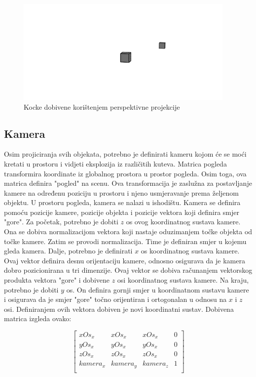 \documentclass{foi}
\begin{document}
\begin{figure}[H]
	\centering
	\includegraphics[width=0.95\textwidth]{slike/37_PerspektivnaProjekcijaKuba.png}
	\captionsetup{justification=centering}
	\caption{Kocke dobivene korištenjem perspektivne projekcije}
	\label{fig:PerspektivnaProjekcijaKuba}
\end{figure}

\subsection{Kamera}
Osim projiciranja svih objekata, potrebno je definirati kameru kojom će se moći kretati u prostoru i vidjeti eksplozija iz različitih kuteva. Matrica pogleda transformira koordinate iz globalnog prostora u prostor pogleda. Osim toga, ova matrica definira "pogled" na scenu. Ova transformacija je zaslužna za postavljanje kamere na određenu poziciju u prostoru i njeno usmjeravanje prema željenom objektu. U prostoru pogleda, kamera se nalazi u ishodištu. Kamera se definira pomoću pozicije kamere, pozicije objekta i pozicije vektora koji definira smjer "gore". Za početak, potrebno je dobiti $z$ os ovog koordinatnog sustava kamere. Ona se dobiva normalizacijom vektora koji nastaje oduzimanjem točke objekta od točke kamere. Zatim se provodi normalizacija. Time je definiran smjer u kojemu gleda kamera. Dalje, potrebno je definirati $x$ os koordinatnog sustava kamere. Ovaj vektor definira desnu orijentaciju kamere, odnosno osigurava da je kamera dobro pozicionirana u tri dimenzije. Ovaj vektor se dobiva računanjem vektorskog produkta vektora "gore" i dobivene $z$ osi koordinatnog sustava kamere. Na kraju, potrebno je dobiti $y$ os. On definira gornji smjer u koordinatnom sustavu kamere i osigurava da je smjer "gore" točno orijentiran i ortogonalan u odnosu na $x$ i $z$ osi. Definiranjem ovih vektora dobiven je novi koordinatni sustav. Dobivena matrica izgleda ovako:

\[
\begin{bmatrix}
	xOs_x & xOs_x & xOs_x & 0 \\
	yOs_x & yOs_x & yOs_x & 0 \\
	zOs_x & zOs_x & zOs_x & 0 \\
	kamera_x & kamera_y & kamera_z & 1 \\
\end{bmatrix}
\]
\end{document}

